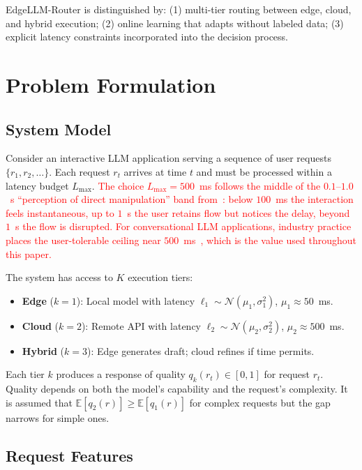 \documentclass[final,3p,twocolumn,authoryear]{elsarticle}
\newcommand{\rev}[1]{\textcolor{red}{#1}}
\newcommand{\system}{EdgeLLM-Router\xspace}
\theoremstyle{plain}
\theoremstyle{definition}
\begin{document}
\system{} is distinguished by: (1) multi-tier routing between edge, cloud, and hybrid execution; (2) online learning that adapts without labeled data; (3) explicit latency constraints incorporated into the decision process.

\section{Problem Formulation}
\label{sec:problem}

\subsection{System Model}

Consider an interactive LLM application serving a sequence of user requests $\{r_1, r_2, \ldots\}$.
Each request $r_t$ arrives at time $t$ and must be processed within a latency budget $L_{\max}$.
\rev{The choice $L_{\max}{=}500$~ms follows the middle of the $0.1$--$1.0$~s ``perception of direct manipulation'' band from~\citet{nielsen1993response}: below $100$~ms the interaction feels instantaneous, up to $1$~s the user retains flow but notices the delay, beyond $1$~s the flow is disrupted. For conversational LLM applications, industry practice places the user-tolerable ceiling near $500$~ms~\citep{chen2023frugalgpt,ong2024routellm}, which is the value used throughout this paper.}

The system has access to $K$ execution tiers:
\begin{itemize}
  \item \textbf{Edge} ($k=1$): Local model with latency $\ell_1 \sim \mathcal{N}(\mu_1, \sigma_1^2)$, $\mu_1 \approx 50$~ms.
  \item \textbf{Cloud} ($k=2$): Remote API with latency $\ell_2 \sim \mathcal{N}(\mu_2, \sigma_2^2)$, $\mu_2 \approx 500$~ms.
  \item \textbf{Hybrid} ($k=3$): Edge generates draft; cloud refines if time permits.
\end{itemize}

Each tier $k$ produces a response of quality $q_k(r_t) \in [0, 1]$ for request $r_t$.
Quality depends on both the model's capability and the request's complexity.
It is assumed that $\mathbb{E}[q_2(r)] \geq \mathbb{E}[q_1(r)]$ for complex requests but the gap narrows for simple ones.

\subsection{Request Features}
\end{document}
